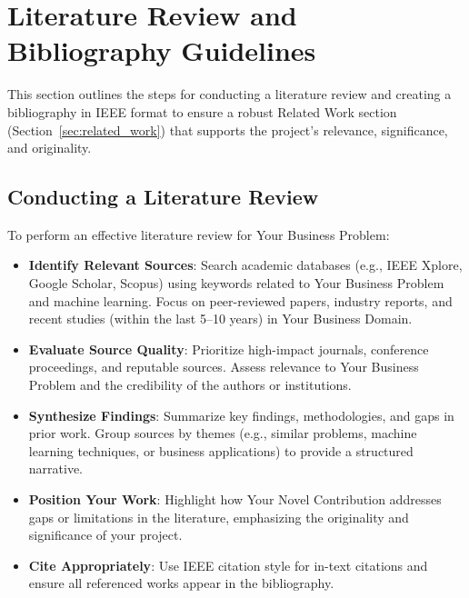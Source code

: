 \documentclass[conference]{IEEEtran}
\begin{document}
\section{Literature Review and Bibliography Guidelines}
This section outlines the steps for conducting a literature review and creating a bibliography in IEEE format to ensure a robust Related Work section (Section~\ref{sec:related_work}) that supports the project's relevance, significance, and originality.

\subsection{Conducting a Literature Review}
To perform an effective literature review for Your Business Problem:
\begin{itemize}
    \item \textbf{Identify Relevant Sources}: Search academic databases (e.g., IEEE Xplore, Google Scholar, Scopus) using keywords related to Your Business Problem and machine learning. Focus on peer-reviewed papers, industry reports, and recent studies (within the last 5–10 years) in Your Business Domain.
    \item \textbf{Evaluate Source Quality}: Prioritize high-impact journals, conference proceedings, and reputable sources. Assess relevance to Your Business Problem and the credibility of the authors or institutions.
    \item \textbf{Synthesize Findings}: Summarize key findings, methodologies, and gaps in prior work. Group sources by themes (e.g., similar problems, machine learning techniques, or business applications) to provide a structured narrative.
    \item \textbf{Position Your Work}: Highlight how Your Novel Contribution addresses gaps or limitations in the literature, emphasizing the originality and significance of your project.
    \item \textbf{Cite Appropriately}: Use IEEE citation style for in-text citations and ensure all referenced works appear in the bibliography.
\end{itemize}
\end{document}

